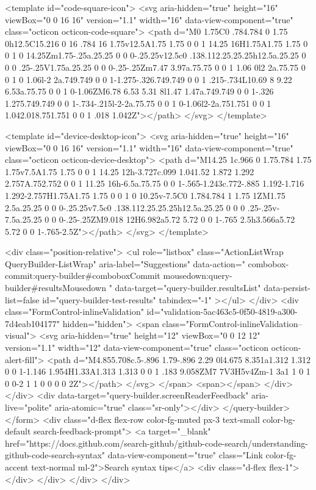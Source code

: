 <template id="code-square-icon">
  <svg aria-hidden="true" height="16" viewBox="0 0 16 16" version="1.1" width="16" data-view-component="true" class="octicon octicon-code-square">
    <path d="M0 1.75C0 .784.784 0 1.75 0h12.5C15.216 0 16 .784 16 1.75v12.5A1.75 1.75 0 0 1 14.25 16H1.75A1.75 1.75 0 0 1 0 14.25Zm1.75-.25a.25.25 0 0 0-.25.25v12.5c0 .138.112.25.25.25h12.5a.25.25 0 0 0 .25-.25V1.75a.25.25 0 0 0-.25-.25Zm7.47 3.97a.75.75 0 0 1 1.06 0l2 2a.75.75 0 0 1 0 1.06l-2 2a.749.749 0 0 1-1.275-.326.749.749 0 0 1 .215-.734L10.69 8 9.22 6.53a.75.75 0 0 1 0-1.06ZM6.78 6.53 5.31 8l1.47 1.47a.749.749 0 0 1-.326 1.275.749.749 0 0 1-.734-.215l-2-2a.75.75 0 0 1 0-1.06l2-2a.751.751 0 0 1 1.042.018.751.751 0 0 1 .018 1.042Z"></path>
</svg>
</template>

<template id="device-desktop-icon">
  <svg aria-hidden="true" height="16" viewBox="0 0 16 16" version="1.1" width="16" data-view-component="true" class="octicon octicon-device-desktop">
    <path d="M14.25 1c.966 0 1.75.784 1.75 1.75v7.5A1.75 1.75 0 0 1 14.25 12h-3.727c.099 1.041.52 1.872 1.292 2.757A.752.752 0 0 1 11.25 16h-6.5a.75.75 0 0 1-.565-1.243c.772-.885 1.192-1.716 1.292-2.757H1.75A1.75 1.75 0 0 1 0 10.25v-7.5C0 1.784.784 1 1.75 1ZM1.75 2.5a.25.25 0 0 0-.25.25v7.5c0 .138.112.25.25.25h12.5a.25.25 0 0 0 .25-.25v-7.5a.25.25 0 0 0-.25-.25ZM9.018 12H6.982a5.72 5.72 0 0 1-.765 2.5h3.566a5.72 5.72 0 0 1-.765-2.5Z"></path>
</svg>
</template>

        <div class="position-relative">
                <ul
                  role="listbox"
                  class="ActionListWrap QueryBuilder-ListWrap"
                  aria-label="Suggestions"
                  data-action="
                    combobox-commit:query-builder#comboboxCommit
                    mousedown:query-builder#resultsMousedown
                  "
                  data-target="query-builder.resultsList"
                  data-persist-list=false
                  id="query-builder-test-results"
                  tabindex="-1"
                ></ul>
        </div>
      <div class="FormControl-inlineValidation" id="validation-5ac463c5-0f50-4819-a300-7d4eab104177" hidden="hidden">
        <span class="FormControl-inlineValidation--visual">
          <svg aria-hidden="true" height="12" viewBox="0 0 12 12" version="1.1" width="12" data-view-component="true" class="octicon octicon-alert-fill">
    <path d="M4.855.708c.5-.896 1.79-.896 2.29 0l4.675 8.351a1.312 1.312 0 0 1-1.146 1.954H1.33A1.313 1.313 0 0 1 .183 9.058ZM7 7V3H5v4Zm-1 3a1 1 0 1 0 0-2 1 1 0 0 0 0 2Z"></path>
</svg>
        </span>
        <span></span>
</div>    </div>
    <div data-target="query-builder.screenReaderFeedback" aria-live="polite" aria-atomic="true" class="sr-only"></div>
</query-builder></form>
          <div class="d-flex flex-row color-fg-muted px-3 text-small color-bg-default search-feedback-prompt">
            <a target="_blank" href="https://docs.github.com/search-github/github-code-search/understanding-github-code-search-syntax" data-view-component="true" class="Link color-fg-accent text-normal ml-2">Search syntax tips</a>            <div class="d-flex flex-1"></div>
          </div>
        </div>
</div>

